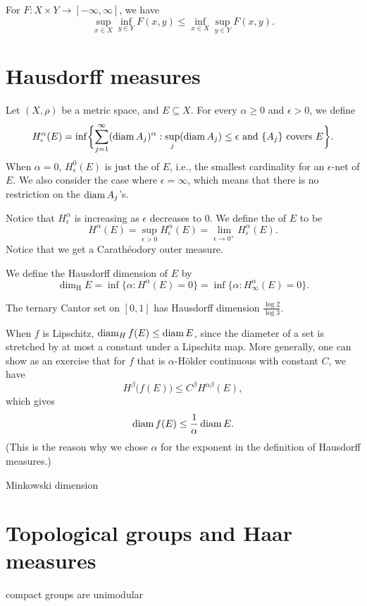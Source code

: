 \begin{lem}
    For $F\colon X \times Y\to [-\infty, \infty]$, we have \[
        \sup_{x \in X}\inf_{y\in Y} F(x,y)\leq \inf_{x\in X}\sup_{y\in Y} F(x,y).
    \]
\end{lem}

\section{Hausdorff measures}
Let $(X,\rho)$ be a metric space, and $E \subseteq X$. For every $\alpha \geq 0$ and $\epsilon > 0$, we define \[
    H_\epsilon^\alpha (E) = \inf\biggl\{\sum_{j=1}^\infty (\operatorname{diam} A_j)^\alpha : \sup_j (\operatorname{diam} A_j) \leq \epsilon \text{ and }  \{A_j\} \text{ covers }E\biggr\}.
\]
When $\alpha = 0$, $H_\epsilon^0(E)$ is just the  of $E$, i.e., the smallest cardinality for an $\epsilon$-net of $E$. We also consider the case where $\epsilon = \infty$, which means that there is no restriction on the $\operatorname{diam} A_j$'s.

Notice that $H_\epsilon^\alpha$ is increasing as $\epsilon$ decreases to $0$. We define the  of $E$ to be \[
    H^\alpha(E) = \sup_{\epsilon > 0} H_\epsilon^\alpha(E) = \lim_{\epsilon \to 0^+} H_\epsilon^\alpha (E).
\]
Notice that we get a Carathéodory outer measure. 

We define the Hausdorff dimension of $E$ by \[
    \dim_{\mathrm H} E = \inf\{\alpha : H^\alpha (E) = 0\} = \inf\{\alpha : H^\alpha_\infty (E) = 0\}.
\]

The ternary Cantor set on $[0,1]$ has Hausdorff dimension $\frac{\log 2}{\log 3}$.

When $f$ is Lipschitz, $\operatorname{diam}_H f(E) \leq \operatorname{diam} E$, since the diameter of a set is stretched by at most a constant under a Lipschitz map. More generally, one can show as an exercise that for $f$ that is $\alpha$-Hölder continuous with constant $C$, we have \[
    H^\beta \bigl(f(E)\bigr) \leq C^\beta H^{\alpha \beta}(E),
\] which gives \[
    \operatorname{diam} f(E) \leq \frac{1}{\alpha} \operatorname{diam} E.
\]
(This is the reason why we chose $\alpha$ for the exponent in the definition of Hausdorff measures.)


Minkowski dimension


\section{Topological groups and Haar measures}

compact groups are unimodular

